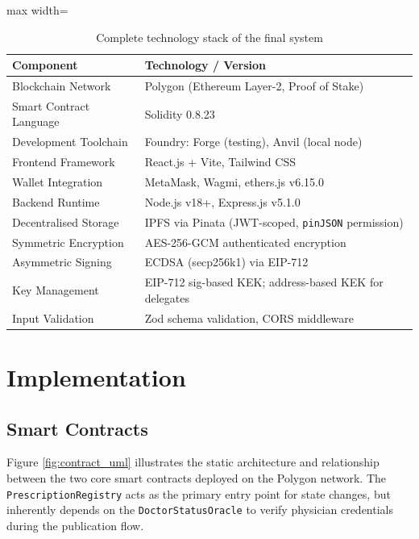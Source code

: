 \documentclass[12pt,a4wide]{report}
\begin{document}
\begin{table}[H]
\centering
\caption{Complete technology stack of the final system}
\label{tab:tech}
\begin{adjustbox}{max width=\textwidth}
\begin{tabular}{@{}ll@{}}
\toprule
\textbf{Component} & \textbf{Technology / Version} \\
\midrule
Blockchain Network      & Polygon (Ethereum Layer-2, Proof of Stake) \\
Smart Contract Language & Solidity 0.8.23 \\
Development Toolchain   & Foundry: Forge (testing), Anvil (local node) \\
Frontend Framework      & React.js + Vite, Tailwind CSS \\
Wallet Integration      & MetaMask, Wagmi, ethers.js v6.15.0 \\
Backend Runtime         & Node.js v18+, Express.js v5.1.0 \\
Decentralised Storage   & IPFS via Pinata (JWT-scoped, \texttt{pinJSON} permission) \\
Symmetric Encryption    & AES-256-GCM authenticated encryption \\
Asymmetric Signing      & ECDSA (secp256k1) via EIP-712 \\
Key Management          & EIP-712 sig-based KEK; address-based KEK for delegates \\
Input Validation        & Zod schema validation, CORS middleware \\
\bottomrule
\end{tabular}
\end{adjustbox}
\end{table}

\chapter{Implementation}

\section{Smart Contracts}

Figure \ref{fig:contract_uml} illustrates the static architecture and relationship between the two core smart contracts deployed on the Polygon network. The \texttt{PrescriptionRegistry} acts as the primary entry point for state changes, but inherently depends on the \texttt{DoctorStatusOracle} to verify physician credentials during the publication flow.
\end{document}
